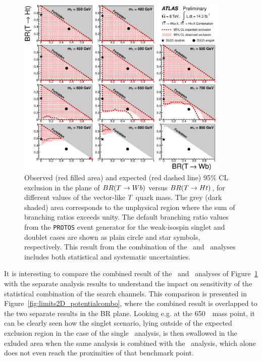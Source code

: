 \begin{figure}[h!bt]
\centering
\includegraphics[width=0.9\textwidth]{results/figures/lim_Scan2D_comb.eps}
\caption{
Observed (red filled area) and expected (red dashed line) 95\% CL exclusion in the plane of
$BR(\T \to Wb)$ versus $BR(\T \to Ht)$, for different values of the vector-like $\T$ quark mass.
The grey (dark shaded) area corresponds to the unphysical region where the sum of branching ratios exceeds unity. 
The default branching ratio values from the \texttt{PROTOS} event generator for the weak-isospin singlet and doublet cases 
are shown as plain circle and star symbols, respectively. This result  from the combination of
the \wbx\ and \htx\ analyses includes both statistical and systematic uncertainties.
\label{fig:limits2D_combo}}
\end{figure}

It is interesting to compare the 
combined result
of the \wbx\ and \htx\ analyses
of Figure~\ref{fig:limits2D_combo} 
with the separate analysis results
to understand the impact on sensitivity
of the statistical combination of
the search channels.
This comparison is presented in 
Figure~\ref{fig:limits2D_potentialcombo},
where the combined result is overlapped
to the two separate results in the BR
plane.
Looking e.g. at the 650~\gev\ mass point,
it can be clearly seen how the singlet
scenario, lying outside of the expected exclusion
region in the case of the single \htx\ analysis,
is then swallowed in the exluded area when
the same analysis is combined with the
\wbx\ analysis, which alone does not even
reach the proximities of that benchmark point.


